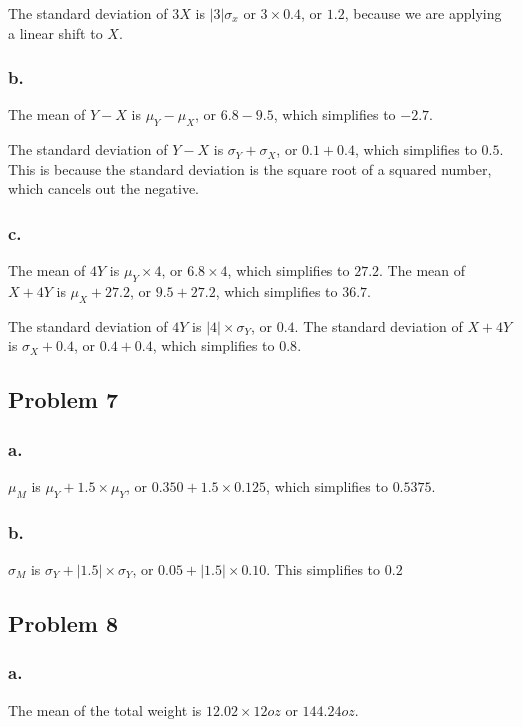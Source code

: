 \documentclass[11pt]{article}
\begin{document}
The standard deviation of $3X$ is $|3|\sigma_x$ or $3\times 0.4$, or $1.2$,
because we are applying a linear shift to $X$. 

\subsubsection{b.}
The mean of $Y - X$ is $\mu_Y - \mu_X$, or $6.8 - 9.5$, which simplifies to
$-2.7$. 

The standard deviation of $Y - X$ is $\sigma_Y + \sigma_X$, or $0.1+0.4$, which
simplifies to $0.5$. This is because the standard deviation is the square root
of a squared number, which cancels out the negative. 

\subsubsection{c.}
The mean of $4Y$ is $\mu_Y\times 4$, or $6.8 \times 4$, which simplifies to
$27.2$. The mean of $X + 4Y$ is $\mu_X + 27.2$, or $9.5 + 27.2$, which
simplifies to $36.7$. 

The standard deviation of $4Y$ is $|4|\times \sigma_Y$, or $0.4$. The standard
deviation of $X + 4Y$ is $\sigma_X + 0.4$, or $0.4+0.4$, which simplifies to
$0.8$. 

\subsection{Problem 7}
\subsubsection{a.}
$\mu_M$ is $\mu_Y+1.5\times \mu_Y$, or $0.350 + 1.5\times 0.125$, which
simplifies to $0.5375$.

\subsubsection{b.}
$\sigma_M$ is $\sigma_Y+|1.5|\times \sigma_Y$, or $0.05+|1.5|\times 0.10$. This
simplifies to $0.2$

\subsection{Problem 8}
\subsubsection{a.}
The mean of the total weight is $12.02 \times 12 oz$ or $144.24 oz$.
\end{document}
